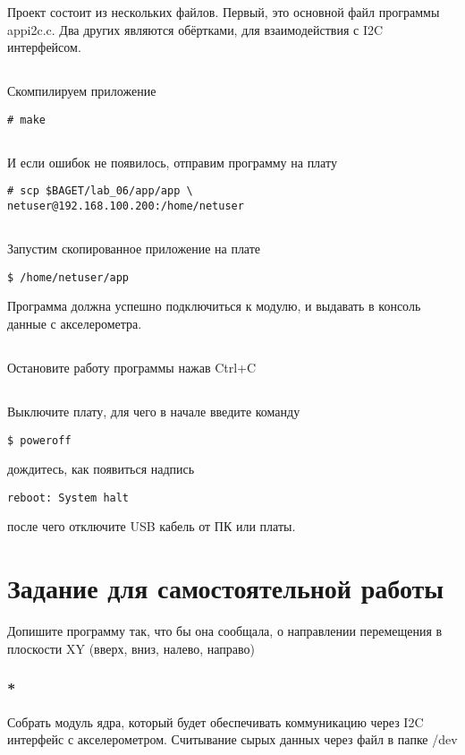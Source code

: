 Проект состоит из нескольких файлов. Первый, это основной файл программы appi2c.c. Два других являются обёртками, для взаимодействия с I2C интерфейсом.

\subsection{}Скомпилируем приложение
\begin{lstlisting}[style=bash]
# make
\end{lstlisting}

\subsection{}И если ошибок не появилось, отправим программу на плату
\begin{lstlisting}[style=bash]
# scp $BAGET/lab_06/app/app \
netuser@192.168.100.200:/home/netuser
\end{lstlisting}

\subsection{}Запустим скопированное приложение на плате
\begin{lstlisting}[style=bash]
$ /home/netuser/app
\end{lstlisting}

Программа должна успешно подключиться к модулю, и выдавать в консоль данные с акселерометра.

\subsection{}Остановите работу программы нажав Ctrl+C

\subsection{} Выключите плату, для чего в начале введите команду
\begin{lstlisting}[style=bash]
	$ poweroff
\end{lstlisting}
дождитесь, как появиться надпись
\begin{lstlisting}[style=stdout]
	reboot: System halt
\end{lstlisting}
после чего отключите USB кабель от ПК или платы. 

\section{Задание для самостоятельной работы}

Допишите программу так, что бы она сообщала, о направлении перемещения в плоскости XY (вверх, вниз, налево, направо)

\subsubsection{*} Собрать модуль ядра, который будет обеспечивать коммуникацию через I2C интерфейс с акселерометром. Считывание сырых данных через файл в папке /dev